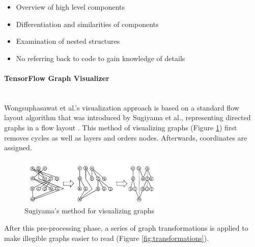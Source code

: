 \documentclass{acmsiggraph}               %
\newcommand{\paragraphbr}[1]{\paragraph{#1}\mbox{}\\}
\begin{document}
\begin{itemize}
  \setlength\itemsep{0em}
  \item Overview of high level components
  \item Differentiation and similarities of components
  \item Examination of nested structures
  \item No referring back to code to gain knowledge of details
\end{itemize}

\paragraphbr{TensorFlow Graph Visualizer}

Wongsuphasawat et al.'s visualization approach is based on a standard flow layout algorithm that was introduced by Sugiyama et al., representing directed graphs in a flow layout \cite{Sugiyama1981}. This method of visualizing graphs (Figure \ref{fig:sugiyama_method}) first removes cycles as well as layers and orders nodes. Afterwards, coordinates are assigned.

\begin{figure}[H]
\includegraphics[width=2.75in]{sugiyama_method_sugiyama_et_al}
\caption{Sugiyama's method for visualizing graphs \protect\cite{Sugiyama1981}}
\label{fig:sugiyama_method}
\centering
\end{figure}

After this pre-processing phase, a series of graph transformations is applied to make illegible graphs easier to read (Figure \ref{fig:transformations}). \\
\end{document}

